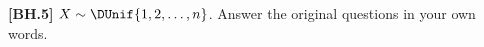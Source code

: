 \begin{exercise}\label{ex65}
	\textbf{[BH.5]} $X\sim \DUnif{1, 2, \ldots, n}$. Answer the original questions in your own words. 
\end{exercise}